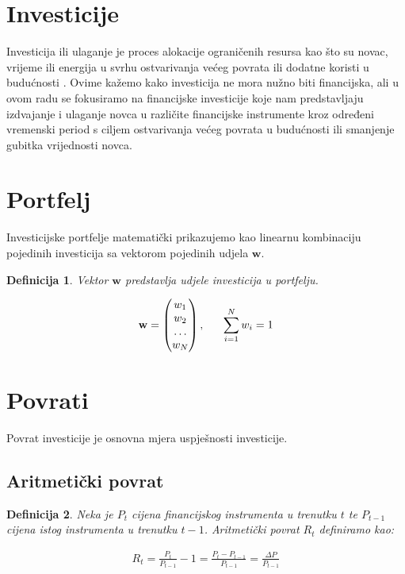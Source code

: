 \documentclass[zavrsnirad]{fer}
\newtheorem{definition}{Definicija}
\begin{document}
\section{Investicije}
\label{sek:investicije}
Investicija ili ulaganje je proces alokacije ograničenih resursa
kao što su novac, vrijeme ili energija u svrhu ostvarivanja
većeg povrata ili dodatne koristi u budućnosti \cite{Investments}.
Ovime kažemo kako investicija ne mora nužno biti financijska,
ali u ovom radu se fokusiramo na financijske investicije koje nam
predstavljaju izdvajanje i ulaganje novca u različite financijske instrumente
kroz određeni vremenski period s ciljem ostvarivanja većeg povrata
u budućnosti ili smanjenje gubitka vrijednosti novca.

\section{Portfelj}
\label{sek:portfelj}
Investicijske portfelje matematički prikazujemo kao linearnu kombinaciju
pojedinih investicija sa vektorom pojedinih udjela $\mathbf{w}$.
\begin{definition}
	Vektor $\mathbf{w}$ predstavlja udjele investicija u portfelju.
\end{definition}
\begin{align*}
	\mathbf{w} = \begin{pmatrix} w_1 \\ w_2 \\ \dots \\ w_N \end{pmatrix},
	\indent \sum_{i = 1}^{N} w_i = 1
\end{align*}

\section{Povrati}
\label{sek:povrati}
Povrat investicije je osnovna mjera uspješnosti investicije.
\subsection{Aritmetički povrat}

\begin{definition}
	Neka je $P_t$ cijena financijskog instrumenta u trenutku $t$ te
    $P_{t-1}$ cijena istog instrumenta u trenutku $t-1$. Aritmetički povrat
    $R_t$ definiramo kao:
\end{definition}
\begin{align*}R_t = \frac{P_t}{P_{t-1}} - 1 =
    \frac{P_t - P_{t-1}}{P_{t-1}} =
\frac{\Delta P}{P_{t-1}}
\end{align*}
\end{document}
